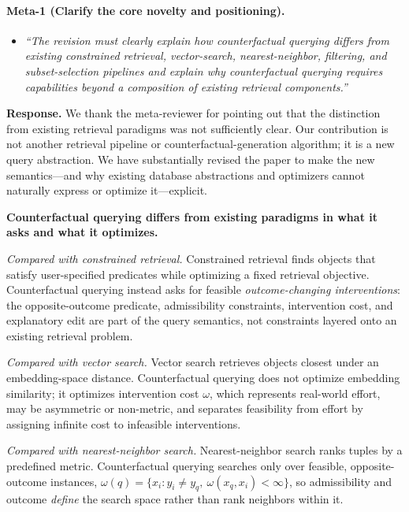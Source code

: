 \paragraph{Meta-1 (Clarify the core novelty and positioning).}

\begin{itemize}[leftmargin=1.2em, itemsep=1pt, topsep=2pt]
\item \textit{``The revision must clearly explain how counterfactual querying differs from existing constrained retrieval, vector-search, nearest-neighbor, filtering, and subset-selection pipelines and explain why counterfactual querying requires capabilities beyond a composition of existing retrieval components.''}
\end{itemize}
\smallskip

\noindent\textbf{Response.}
We thank the meta-reviewer for pointing out that the distinction from existing retrieval paradigms was not sufficiently clear. Our contribution is not another retrieval pipeline or counterfactual-generation algorithm; it is a new query abstraction. We have substantially revised the paper to make the new semantics---and why existing database abstractions and optimizers cannot naturally express or optimize it---explicit.

\textbf{Counterfactual querying differs from existing paradigms in what it asks and what it optimizes.}

\emph{Compared with constrained retrieval.} Constrained retrieval finds objects that satisfy user-specified predicates while optimizing a fixed retrieval objective. Counterfactual querying instead asks for feasible \emph{outcome-changing interventions}: the opposite-outcome predicate, admissibility constraints, intervention cost, and explanatory edit are part of the query semantics, not constraints layered onto an existing retrieval problem.

\emph{Compared with vector search.} Vector search retrieves objects closest under an embedding-space distance. Counterfactual querying does not optimize embedding similarity; it optimizes intervention cost $\omega$, which represents real-world effort, may be asymmetric or non-metric, and separates feasibility from effort by assigning infinite cost to infeasible interventions.

\emph{Compared with nearest-neighbor search.} Nearest-neighbor search ranks tuples by a predefined metric. Counterfactual querying searches only over feasible, opposite-outcome instances, $\omega(q)=\{x_i:y_i\neq y_q,\ \omega(x_q,x_i)<\infty\}$, so admissibility and outcome \emph{define} the search space rather than rank neighbors within it.

